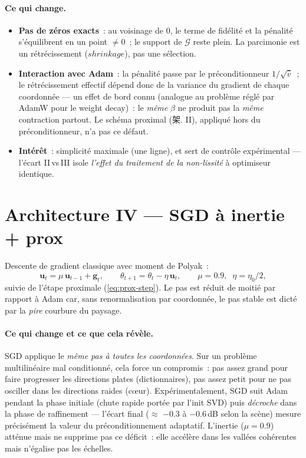 \documentclass[11pt,a4paper]{article}
\newcommand{\T}[1]{\bm{\mathcal{#1}}}          %
\newcommand{\M}[1]{\bm{#1}}                     %
\begin{document}
\paragraph{Ce qui change.}
\begin{itemize}
  \item \textbf{Pas de zéros exacts}~: au voisinage de $0$, le terme de
  fidélité et la pénalité s'équilibrent en un point $\neq 0$~; le support de
  $\T{G}$ reste plein. La \og{}parcimonie\fg{} est un rétrécissement
  ($shrinkage$), pas une sélection.
  \item \textbf{Interaction avec Adam}~: la pénalité passe par le
  préconditionneur $1/\sqrt{\hat{v}}$~; le rétrécissement effectif dépend
  donc de la variance du gradient de chaque coordonnée — un effet de bord
  connu (analogue au problème réglé par AdamW pour le weight decay)~: le
  \emph{même} $\beta$ ne produit pas la \emph{même} contraction partout.
  Le schéma proximal (架. II), appliqué hors du préconditionneur, n'a pas ce
  défaut.
  \item \textbf{Intérêt}~: simplicité maximale (une ligne), et sert de
  contrôle expérimental — l'écart II$\,$vs$\,$III isole \emph{l'effet du
  traitement de la non-lissité} à optimiseur identique.
\end{itemize}

\section{Architecture IV --- SGD à inertie + prox}
\label{sec:sgd}

Descente de gradient classique avec moment de Polyak~:
\begin{equation}
  \M{u}_t = \mu\,\M{u}_{t-1} + \M{g}_t, \qquad
  \theta_{t+1} = \theta_t - \eta\,\M{u}_t,
  \qquad \mu = 0.9,\;\; \eta = \eta_0/2,
  \label{eq:sgd}
\end{equation}
suivie de l'étape proximale (\ref{eq:prox-step}). Le pas est réduit de moitié
par rapport à Adam car, sans renormalisation par coordonnée, le pas stable est
dicté par la \emph{pire} courbure du paysage.

\paragraph{Ce qui change et ce que cela révèle.}
SGD applique le \emph{même pas à toutes les coordonnées}. Sur un problème
multilinéaire mal conditionné, cela force un compromis~: pas assez grand pour
faire progresser les directions plates (dictionnaires), pas assez petit pour
ne pas osciller dans les directions raides (c\oe ur). Expérimentalement, SGD
suit Adam pendant la phase initiale (chute rapide portée par l'init SVD) puis
\emph{décroche} dans la phase de raffinement — l'écart final ($\approx$
$-0.3$ à $-0.6$\,dB selon la scène) mesure précisément la valeur du
préconditionnement adaptatif. L'inertie ($\mu=0.9$) atténue mais ne supprime
pas ce déficit~: elle accélère dans les vallées cohérentes mais n'égalise pas
les échelles.
\end{document}
